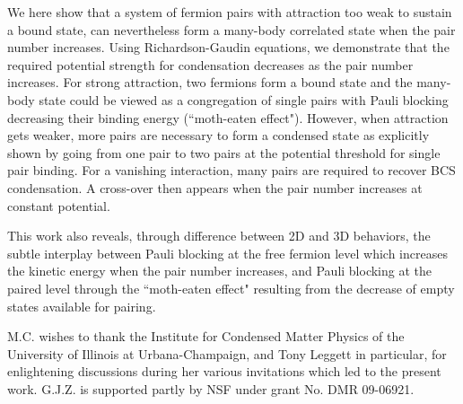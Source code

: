 \documentclass[5p,twocolumn]{elsarticle}
\begin{document}
We here show that a system of fermion pairs with attraction too weak to sustain a bound state, can nevertheless form a many-body correlated state when the pair number increases.  Using Richardson-Gaudin equations, we demonstrate that the required potential strength for condensation decreases as the pair number increases.  For strong attraction, two fermions form a bound state and the many-body state could be viewed as a congregation of single pairs with Pauli blocking decreasing their binding energy (``moth-eaten effect").  However, when attraction gets weaker, more pairs are necessary to form a condensed state as explicitly shown by going from one pair to two pairs at the potential threshold for single pair binding.  For a vanishing interaction, many pairs are required to recover BCS condensation.   A cross-over then appears when the pair number increases at constant potential.

 This work also reveals, through difference between 2D and 3D behaviors, the subtle interplay between Pauli blocking at the free fermion level which increases the kinetic energy when the pair number increases, and Pauli blocking at the paired level through the ``moth-eaten effect" resulting from the decrease of empty states available for pairing.

M.C. wishes to thank the Institute for Condensed Matter Physics of the University of Illinois at
Urbana-Champaign, and Tony Leggett in particular, for enlightening discussions during her various invitations which led to the present work. G.J.Z. is supported partly by NSF under grant No. DMR 09-06921.  
\end{document}
